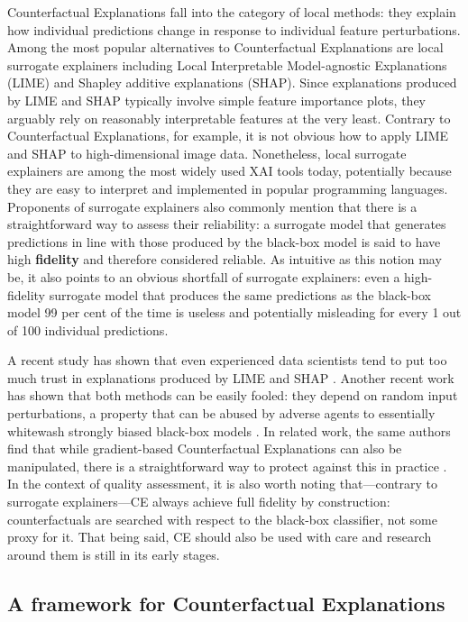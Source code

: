 \documentclass[
  letterpaper,
  DIV=11,
  numbers=noendperiod]{scrartcl}
\begin{document}
Counterfactual Explanations fall into the category of local methods:
they explain how individual predictions change in response to individual
feature perturbations. Among the most popular alternatives to
Counterfactual Explanations are local surrogate explainers including
Local Interpretable Model-agnostic Explanations (LIME) and Shapley
additive explanations (SHAP). Since explanations produced by LIME and
SHAP typically involve simple feature importance plots, they arguably
rely on reasonably interpretable features at the very least. Contrary to
Counterfactual Explanations, for example, it is not obvious how to apply
LIME and SHAP to high-dimensional image data. Nonetheless, local
surrogate explainers are among the most widely used XAI tools today,
potentially because they are easy to interpret and implemented in
popular programming languages. Proponents of surrogate explainers also
commonly mention that there is a straightforward way to assess their
reliability: a surrogate model that generates predictions in line with
those produced by the black-box model is said to have high
\textbf{fidelity} and therefore considered reliable. As intuitive as
this notion may be, it also points to an obvious shortfall of surrogate
explainers: even a high-fidelity surrogate model that produces the same
predictions as the black-box model 99 per cent of the time is useless
and potentially misleading for every 1 out of 100 individual
predictions.

A recent study has shown that even experienced data scientists tend to
put too much trust in explanations produced by LIME and SHAP
\cite{kaur2020interpreting}. Another recent work has shown that both
methods can be easily fooled: they depend on random input perturbations,
a property that can be abused by adverse agents to essentially whitewash
strongly biased black-box models \cite{slack2020fooling}. In related
work, the same authors find that while gradient-based Counterfactual
Explanations can also be manipulated, there is a straightforward way to
protect against this in practice \cite{slack2021counterfactual}. In the
context of quality assessment, it is also worth noting that---contrary
to surrogate explainers---CE always achieve full fidelity by
construction: counterfactuals are searched with respect to the black-box
classifier, not some proxy for it. That being said, CE should also be
used with care and research around them is still in its early stages.

\hypertarget{sec-method}{%
\subsection{A framework for Counterfactual
Explanations}\label{sec-method}}
\end{document}
